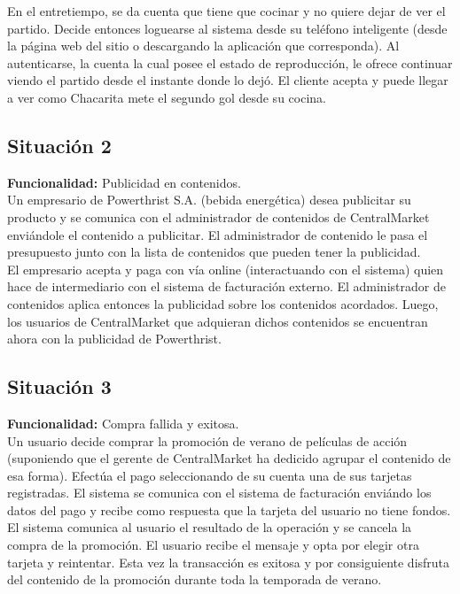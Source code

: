 \documentclass[11pt, a4paper, spanish]{article}
\begin{document}
        En el entretiempo, se da cuenta que tiene que cocinar y no quiere dejar de ver el partido. Decide entonces loguearse al sistema desde su 
    tel\'efono inteligente (desde la p\'agina web del sitio o descargando la aplicaci\'on que corresponda). 
    Al autenticarse, la cuenta la cual posee el estado de reproducci\'on, le ofrece continuar viendo el partido desde el instante donde lo dej\'o.
    El cliente acepta y puede llegar a ver como Chacarita mete el segundo gol desde su cocina.

\subsection{Situaci\'on 2}

	\textbf{Funcionalidad:} Publicidad en contenidos.\\

        Un empresario de Powerthrist S.A. (bebida energ\'etica) desea publicitar su producto y se comunica con el administrador de contenidos de 
    CentralMarket envi\'andole el contenido a publicitar.
    El administrador de contenido le pasa el presupuesto junto con la lista de contenidos que pueden tener la publicidad.\\

    El empresario acepta y paga con v\'ia online (interactuando con el sistema) quien hace de intermediario con el sistema de facturaci\'on externo.
    El administrador de contenidos aplica entonces la publicidad sobre los contenidos acordados.
    Luego, los usuarios de CentralMarket que adquieran dichos contenidos se encuentran ahora con la publicidad de Powerthrist.

\newpage

\subsection{Situaci\'on 3}

	\textbf{Funcionalidad:} Compra fallida y exitosa.\\

        Un usuario decide comprar la promoci\'on de verano de pel\'iculas de acci\'on (suponiendo que el gerente de CentralMarket ha dedicido agrupar el
    contenido de esa forma). Efect\'ua el pago seleccionando de su cuenta una de sus tarjetas registradas. El sistema se comunica con el sistema de 
    facturaci\'on envi\'ando los datos del pago y recibe como respuesta que la tarjeta del usuario no tiene fondos. \\
	El sistema comunica al usuario el 
    resultado de la operaci\'on y se cancela la compra de la promoci\'on. El usuario recibe el mensaje y opta por elegir otra tarjeta y reintentar. Esta 
    vez la transacci\'on es exitosa y por consiguiente disfruta del contenido de la promoci\'on durante toda la temporada de verano.
\end{document}
